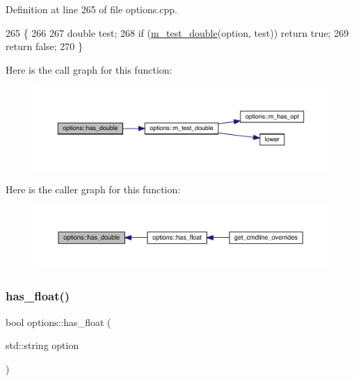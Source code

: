 Definition at line 265 of file options.\+cpp.


\begin{DoxyCode}
265                                          \{
266 
267   \textcolor{keywordtype}{double} test;
268   \textcolor{keywordflow}{if} (\hyperlink{classoptions_a0eebdb8dbce454720ef9251fcd7abf24}{m\_test\_double}(option, test)) \textcolor{keywordflow}{return} \textcolor{keyword}{true};
269   \textcolor{keywordflow}{return} \textcolor{keyword}{false};
270 \}
\end{DoxyCode}
Here is the call graph for this function\+:\nopagebreak
\begin{figure}[H]
\begin{center}
\leavevmode
\includegraphics[width=350pt]{classoptions_ab66aae6c79cdde8dd38d0d3fc8aa3de5_cgraph}
\end{center}
\end{figure}
Here is the caller graph for this function\+:\nopagebreak
\begin{figure}[H]
\begin{center}
\leavevmode
\includegraphics[width=350pt]{classoptions_ab66aae6c79cdde8dd38d0d3fc8aa3de5_icgraph}
\end{center}
\end{figure}
\mbox{\label{classoptions_ae6f1f714c9ad1dc01cb5509df0c4c838}} 
\subsubsection{\texorpdfstring{has\+\_\+float()}{has\_float()}}
{\footnotesize\ttfamily bool options\+::has\+\_\+float (\begin{DoxyParamCaption}\item[{std\+::string}]{option }\end{DoxyParamCaption})\hspace{0.3cm}{\ttfamily [inline]}}



